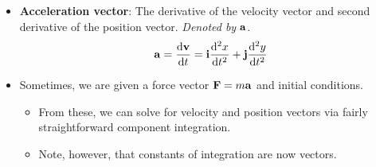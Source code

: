 \documentclass[../main.tex]{subfiles}
\begin{document}
\begin{itemize}
\begin{figure}[H]
        \caption{Velocity vector.}
        \label{fig:velocityVector}
    \end{figure}
    \begin{itemize}
        \item \cite{bib:Thomas} semi-rigorously proves from Figure \ref{fig:velocityVector} that if $\vb{R}$ is the position vector, then $\dv*{\vb{R}}{t}$ is the velocity vector.
        \item Essentially, he proves that
        \begin{equation*}
            \dv{\vb{R}}{t} = \vb{i}\dv{x}{t}+\vb{j}\dv{y}{t}
        \end{equation*}
        It follows from this that
        \begin{align*}
            \text{slope of }\dv{\vb{R}}{t} &= \frac{\vb{j}\text{-component}}{\vb{i}\text{-component}}
            = \frac{\dv*{y}{t}}{\dv*{x}{t}}
            = \dv{y}{x}\\
            \left| \dv{R}{t} \right| &= \left| \vb{i}\dv{x}{t}+\vb{j}\dv{y}{t} \right|
            = \sqrt{\left( \dv{x}{t} \right)^2+\left( \dv{y}{t} \right)^2}
            = \left| \dv{s}{t} \right|
        \end{align*}
    \end{itemize}
    \item \textbf{Acceleration vector}: The derivative of the velocity vector and second derivative of the position vector. \emph{Denoted by} $\vb{a}$.
    \begin{equation*}
        \vb{a} = \dv{\vb{v}}{t} = \vb{i}\dv[2]{x}{t}+\vb{j}\dv[2]{y}{t}
    \end{equation*}
    \item Sometimes, we are given a force vector $\vb{F}=m\vb{a}$ and initial conditions.
    \begin{itemize}
        \item From these, we can solve for velocity and position vectors via fairly straightforward component integration.
        \item Note, however, that constants of integration are now vectors.
    \end{itemize}
\end{itemize}
\end{document}
